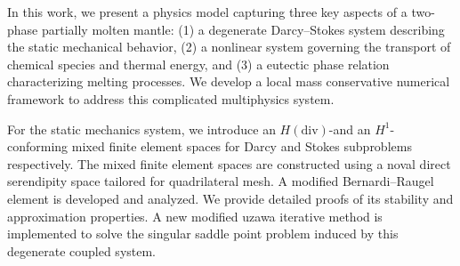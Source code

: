 In this work, we present a physics model capturing three key aspects of a 
two-phase partially molten mantle: (1) a degenerate Darcy–Stokes system 
describing the static mechanical behavior, (2) a nonlinear  
system governing the transport of chemical species and thermal energy, 
and (3) a eutectic phase relation characterizing melting processes.
We develop a local mass conservative numerical framework to address this 
complicated multiphysics system. 

For the static mechanics system, we introduce an $H(\text{div})$-and an $H^1$- 
conforming mixed finite element spaces for Darcy and Stokes subproblems 
respectively. The mixed finite element spaces are constructed using a noval 
direct serendipity space tailored for quadrilateral mesh.  
A modified Bernardi–Raugel element is developed and analyzed. 
We provide detailed proofs of its stability and approximation properties.
A new modified uzawa iterative method is implemented to solve the 
singular saddle 
point problem induced by this degenerate coupled system. 

